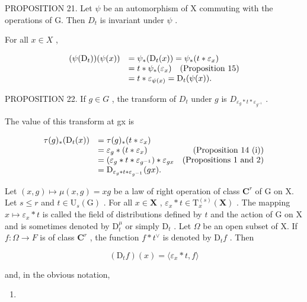PROPOSITION 21. Let \(\psi\) be an automorphism of X commuting with the operations of G. Then \(D_{t}\) is invariant under \(\psi\) .

For all \(x \in X\) ,

\[
\begin{array}{r l} (\psi (\mathrm{D} _ {t})) (\psi (x)) & = \psi_ {*} (\mathrm{D} _ {t} (x)) = \psi_ {*} (t * \varepsilon_ {x}) \\ & = t * \psi_ {*} (\varepsilon_ {x}) \quad \text {(Proposition 15)} \\ & = t * \varepsilon_ {\psi (x)} = \mathrm{D} _ {t} (\psi (x)). \end{array}
\]

PROPOSITION 22. If \(g \in G\) , the transform of \(D_t\) under \(g\) is \(D_{\varepsilon_g * t * \varepsilon_{g^{-1}}}\) .

The value of this transform at gx is

\[
\begin{array}{r l r} \tau (g) _ {*} (\mathrm{D} _ {t} (x)) & = \tau (g) _ {*} (t * \varepsilon_ {x}) \\ & = \varepsilon_ {g} * (t * \varepsilon_ {x}) & \text {(Proposition 14 (i))} \\ & = (\varepsilon_ {g} * t * \varepsilon_ {g^{-1}}) * \varepsilon_ {g x} & \text {(Propositions 1 and 2)} \\ & = \mathrm{D} _ {\varepsilon_ {g} * t * \varepsilon_ {g^{-1}}} (g x). \end{array}
\]

Let \((x,g)\mapsto \mu (x,g) = xg\) be a law of right operation of class \(\mathbf{C}^r\) of G on X. Let \(s\leqslant r\) and \(t\in \mathrm{U}_{s}(\mathrm{G})\) . For all \(x\in \mathbf{X}\) , \(\varepsilon_{x}*t\in \mathrm{T}_{x}^{(s)}(\mathbf{X})\) . The mapping \(x\mapsto \varepsilon_x*t\) is called the field of distributions defined by \(t\) and the action of G on X and is sometimes denoted by \(\mathrm{D}_{t}^{\mu}\) or simply \(\mathrm{D}_t\) . Let \(\Omega\) be an open subset of X. If \(f:\Omega \to F\) is of class \(\mathbf{C}^r\) , the function \(f*t^{\vee}\) is denoted by \(\mathrm{D}_t f\) . Then

\[
\left(\mathrm{D} _ {t} f\right) (x) = \langle \varepsilon_ {x} * t, f \rangle\tag{19}
\]

and, in the obvious notation,

\begin{enumerate}
\def\labelenumi{(\arabic{enumi})}
\setcounter{enumi}{19}
\tightlist
\item
\end{enumerate}

